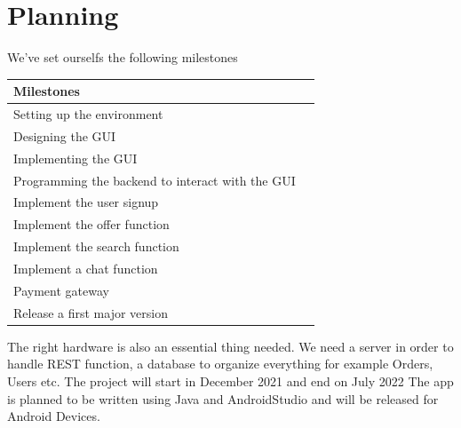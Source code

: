 \documentclass[12pt]{article}
\theoremstyle{definition}
\newenvironment{explanation}{%
}{}
\begin{document}
\section{Planning}
\begin{explanation}
We've set ourselfs the following milestones 
\begin{flushleft}
\begin{tabular}{|l|l|} \hline
Milestones \\ \hline
Setting up the environment \\ \hline
Designing the GUI \\ \hline
Implementing the GUI \\ \hline
Programming the backend to interact with the GUI \\ \hline
Implement the user signup \\ \hline
Implement the offer function \\ \hline
Implement the search function \\ \hline
Implement a chat function \\ \hline
Payment gateway \\ \hline
Release a first major version \\ \hline
\end{tabular}
\end{flushleft}
The right hardware is also an essential thing needed.
\newline
We need a server in order to handle REST function, a database to organize everything for example Orders, Users etc.
\newline
The project will start in December 2021 and end on July 2022
\newline
The app is planned to be written using Java and AndroidStudio and will be released for Android Devices.
\end{explanation}
\end{document}
